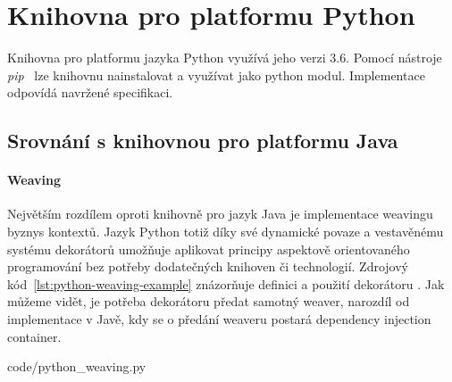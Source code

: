 \section{Knihovna pro platformu Python}

Knihovna pro platformu jazyka Python využívá jeho
verzi 3.6. Pomocí nástroje \textit{pip}~\cite{pip}
lze knihovnu nainstalovat a využívat jako python modul.
Implementace odpovídá navržené specifikaci.


\subsection{Srovnání s knihovnou pro platformu Java}

\paragraph{Weaving} Největším rozdílem oproti knihovně pro
jazyk Java je implementace weavingu byznys kontextů.
Jazyk Python totiž díky své dynamické povaze a vestavěnému
systému dekorátorů umožňuje aplikovat principy aspektově orientovaného
programování bez potřeby dodatečných knihoven či technologií.
Zdrojový kód~\ref{lst:python-weaving-example} znázorňuje
definici a použití dekorátoru .
Jak můžeme vidět, je potřeba dekorátoru předat samotný weaver, narozdíl
od implementace v Javě, kdy se o předání weaveru postará dependency
injection container.


{code/python_weaving.py}

\paragraph{}

